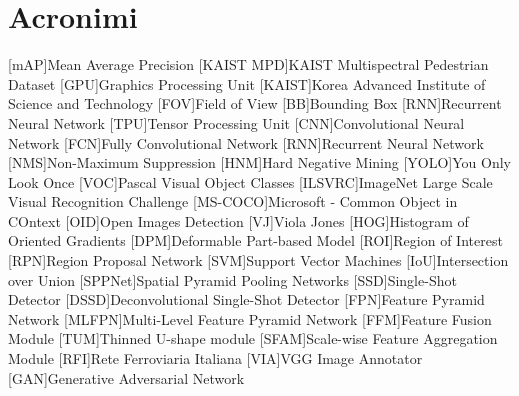 \chapter*{Acronimi}
\begin{acronym}[CAGD]
    [mAP]{Mean Average Precision}
    [KAIST MPD]{KAIST Multispectral Pedestrian Dataset}
    [GPU]{Graphics Processing Unit}
    [KAIST]{Korea Advanced Institute of Science and Technology}
    [FOV]{Field of View}
    [BB]{Bounding Box}
    [RNN]{Recurrent Neural Network}
    [TPU]{Tensor Processing Unit}
    [CNN]{Convolutional Neural Network}
    [FCN]{Fully Convolutional Network}
    [RNN]{Recurrent Neural Network}
    [NMS]{Non-Maximum Suppression}
    [HNM]{Hard Negative Mining}
    [YOLO]{You Only Look Once}
    [VOC]{Pascal Visual Object Classes}
    [ILSVRC]{ImageNet Large Scale Visual Recognition Challenge}
    [MS-COCO]{Microsoft - Common Object in COntext}
    [OID]{Open Images Detection}
    [VJ]{Viola Jones}
    [HOG]{Histogram of Oriented Gradients}
    [DPM]{Deformable Part-based Model}
    [ROI]{Region of Interest}
    [RPN]{Region Proposal Network}
    [SVM]{Support Vector Machines}
    [IoU]{Intersection over Union}
    [SPPNet]{Spatial Pyramid Pooling Networks}
    [SSD]{Single-Shot Detector}
    [DSSD]{Deconvolutional Single-Shot Detector}
    [FPN]{Feature Pyramid Network}
    [MLFPN]{Multi-Level Feature Pyramid Network}
    [FFM]{Feature Fusion Module}
    [TUM]{Thinned U-shape module}
    [SFAM]{Scale-wise Feature Aggregation Module}
    [RFI]{Rete Ferroviaria Italiana}
    [VIA]{VGG Image Annotator}
    [GAN]{Generative Adversarial Network}
\end{acronym}